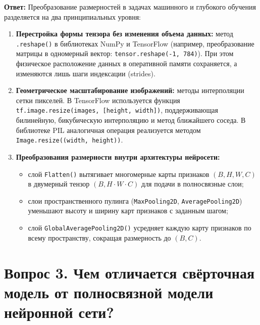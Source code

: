 \textbf{Ответ:}
Преобразование размерностей в задачах машинного и глубокого обучения разделяется на два принципиальных уровня:
\begin{enumerate}
    \item \textbf{Перестройка формы тензора без изменения объема данных:} метод \texttt{.reshape()} в библиотеках NumPy и TensorFlow (например, преобразование матрицы в одномерный вектор: \texttt{tensor.reshape(-1, 784)}). При этом физическое расположение данных в оперативной памяти сохраняется, а изменяются лишь шаги индексации (strides).
    \item \textbf{Геометрическое масштабирование изображений:} методы интерполяции сетки пикселей. В TensorFlow используется функция \texttt{tf.image.resize(images, [height, width])}, поддерживающая билинейную, бикубическую интерполяцию и метод ближайшего соседа. В библиотеке PIL аналогичная операция реализуется методом \texttt{Image.resize((width, height))}.
    \item \textbf{Преобразования размерности внутри архитектуры нейросети:}
    \begin{itemize}
        \item слой \texttt{Flatten()} вытягивает многомерные карты признаков $(B, H, W, C)$ в двумерный тензор $(B, H \cdot W \cdot C)$ для подачи в полносвязные слои;
        \item слои пространственного пулинга (\texttt{MaxPooling2D}, \texttt{AveragePooling2D}) уменьшают высоту и ширину карт признаков с заданным шагом;
        \item слой \texttt{GlobalAveragePooling2D()} усредняет каждую карту признаков по всему пространству, сокращая размерность до $(B, C)$.
    \end{itemize}
\end{enumerate}

\section*{Вопрос 3. Чем отличается свёрточная модель от полносвязной модели нейронной сети?}

